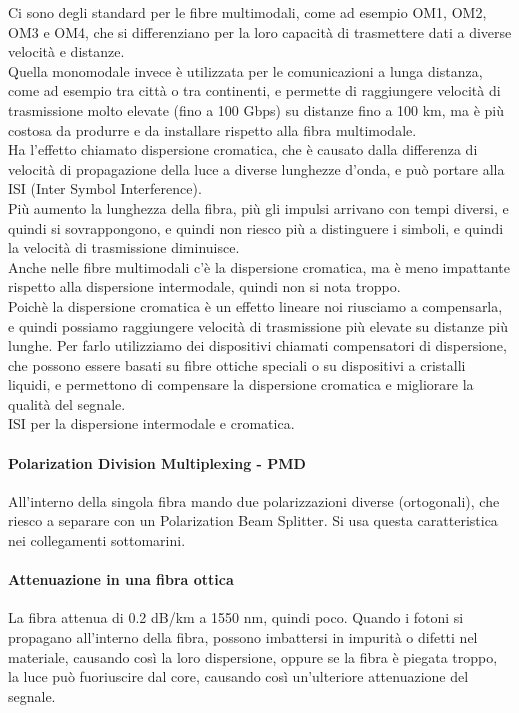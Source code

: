 Ci sono degli standard per le fibre multimodali, come ad esempio OM1, OM2, OM3 e OM4, che si differenziano per la loro capacità di trasmettere dati a diverse velocità e distanze.\\

Quella monomodale invece è utilizzata per le comunicazioni a lunga distanza, come ad esempio tra città o tra continenti, e permette di raggiungere velocità di trasmissione molto elevate 
(fino a 100 Gbps) su distanze fino a 100 km, ma è più costosa da produrre e da installare rispetto alla fibra multimodale.\\
Ha l'effetto chiamato dispersione cromatica, che è causato dalla differenza di velocità di propagazione della luce a diverse lunghezze d'onda, e può portare alla ISI (Inter Symbol Interference).\\
Più aumento la lunghezza della fibra, più gli impulsi arrivano con tempi diversi, e quindi si sovrappongono, e quindi non riesco più a distinguere i simboli, e quindi la velocità di trasmissione diminuisce.\\

Anche nelle fibre multimodali c'è la dispersione cromatica, ma è meno impattante rispetto alla dispersione intermodale, quindi non si nota troppo.\\

Poichè la dispersione cromatica è un effetto lineare noi riusciamo a compensarla, e quindi possiamo raggiungere velocità di trasmissione più elevate su distanze più lunghe. Per farlo 
utilizziamo dei dispositivi chiamati compensatori di dispersione, che possono essere basati su fibre ottiche speciali o su dispositivi a cristalli liquidi, e permettono di compensare la dispersione cromatica
e migliorare la qualità del segnale.\\

ISI per la dispersione intermodale e cromatica.\\

\paragraph{Polarization Division Multiplexing - PMD}
All'interno della singola fibra mando due polarizzazioni diverse (ortogonali), che riesco a separare con un Polarization Beam Splitter. Si usa questa caratteristica nei collegamenti sottomarini.

\paragraph{Attenuazione in una fibra ottica}
La fibra attenua di 0.2 dB/km a 1550 nm, quindi poco. Quando i fotoni si propagano all'interno della fibra, possono imbattersi in impurità o difetti nel materiale, causando così 
la loro dispersione, oppure se la fibra è piegata troppo, la luce può fuoriuscire dal core, causando così un'ulteriore attenuazione del segnale.\\

